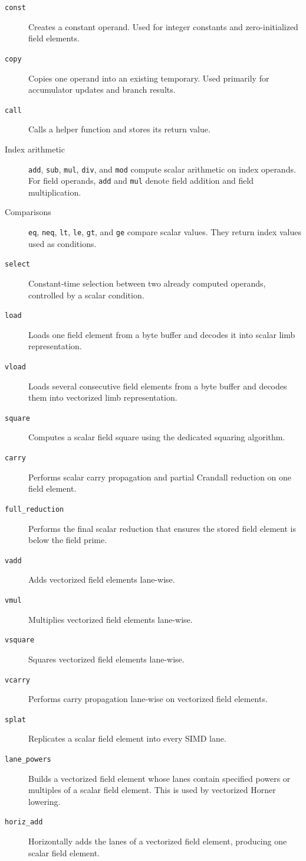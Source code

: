 \begin{description}
    \item[\texttt{const}] Creates a constant operand. Used for integer constants and zero-initialized field elements.
    \item[\texttt{copy}] Copies one operand into an existing temporary. Used primarily for accumulator updates and branch results.
    \item[\texttt{call}] Calls a helper function and stores its return value.
    \item[Index arithmetic] \texttt{add}, \texttt{sub}, \texttt{mul}, \texttt{div}, and \texttt{mod} compute scalar arithmetic on index operands. For field operands, \texttt{add} and \texttt{mul} denote field addition and field multiplication.
    \item[Comparisons] \texttt{eq}, \texttt{neq}, \texttt{lt}, \texttt{le}, \texttt{gt}, and \texttt{ge} compare scalar values. They return index values used as conditions.
    \item[\texttt{select}] Constant-time selection between two already computed operands, controlled by a scalar condition.
    \item[\texttt{load}] Loads one field element from a byte buffer and decodes it into scalar limb representation.
    \item[\texttt{vload}] Loads several consecutive field elements from a byte buffer and decodes them into vectorized limb representation.
    \item[\texttt{square}] Computes a scalar field square using the dedicated squaring algorithm.
    \item[\texttt{carry}] Performs scalar carry propagation and partial Crandall reduction on one field element.
    \item[\texttt{full\_reduction}] Performs the final scalar reduction that ensures the stored field element is below the field prime.
    \item[\texttt{vadd}] Adds vectorized field elements lane-wise.
    \item[\texttt{vmul}] Multiplies vectorized field elements lane-wise.
    \item[\texttt{vsquare}] Squares vectorized field elements lane-wise.
    \item[\texttt{vcarry}] Performs carry propagation lane-wise on vectorized field elements.
    \item[\texttt{splat}] Replicates a scalar field element into every SIMD lane.
    \item[\texttt{lane\_powers}] Builds a vectorized field element whose lanes contain specified powers or multiples of a scalar field element. This is used by vectorized Horner lowering.
    \item[\texttt{horiz\_add}] Horizontally adds the lanes of a vectorized field element, producing one scalar field element.
\end{description}

